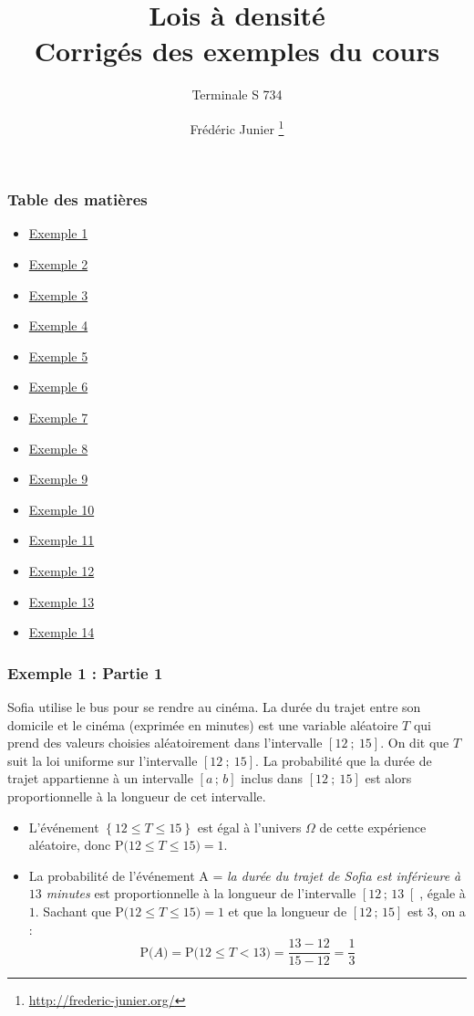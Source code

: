 \documentclass[xcolor=svgnames,t,final]{beamer}
\title{Lois à densité \\ Corrigés des exemples du cours}\subtitle{Terminale S 734}
\author[]{Frédéric Junier \thanks{\url{http://frederic-junier.org/} }}
\institute[Lycée du Parc]{Lycée du Parc, Lyon}
\date[]{}
\newcommand{\Interfo}[2]{\left[#1\, ;\, #2\right[}
\newcommand{\Interff}[2]{\left[#1\, ;\, #2\right]}
\newcommand{\proba}[1]{\text{P}\big(#1\big)}
\begin{document}
\frame{\titlepage}


\begin{frame}
\frametitle{Table des matières}
\begin{itemize}
	\item \hyperlink{exemple1}{Exemple 1}
	\item \hyperlink{exemple2}{Exemple 2}
	\item \hyperlink{exemple3}{Exemple 3}
	\item \hyperlink{exemple4}{Exemple 4}
	\item \hyperlink{exemple5}{Exemple 5}
	\item \hyperlink{exemple6}{Exemple 6}
		\item \hyperlink{exemple7}{Exemple 7}
			\item \hyperlink{exemple8}{Exemple 8}
			\item \hyperlink{exemple9}{Exemple 9}
				\item \hyperlink{exemple10}{Exemple 10}
						\item \hyperlink{exemple11}{Exemple 11}
						\item \hyperlink{exemple12}{Exemple 12}
						\item \hyperlink{exemple13}{Exemple 13}
						\item \hyperlink{exemple14}{Exemple 14}
\end{itemize}

\end{frame}
 


\begin{frame}

\frametitle{Exemple 1 : Partie 1}

\label{exemple1}
Sofia utilise le bus pour se rendre au cinéma.  La durée du trajet entre son domicile et le cinéma (exprimée en minutes) est une variable aléatoire $T$ qui prend des valeurs choisies aléatoirement dans l'intervalle $[12~;~15]$. On dit que $T$ suit la loi uniforme sur l'intervalle $[12~;~15]$. La probabilité que la durée de trajet appartienne à un intervalle $\Interff{a}{b}$ inclus dans $[12~;~15]$ est alors proportionnelle à la longueur de cet intervalle.

\begin{itemize}
\pause \item L'événement $\left\{12 \leqslant  T \leqslant 15\right\}$ est égal à l'univers $\Omega$ de cette expérience aléatoire, donc   $\proba{12 \leqslant T \leqslant 15}=1$.
	\pause \item La probabilité de l'événement A = \og{} \textit{la durée du trajet de Sofia est  inférieure  à $13$ minutes} \fg{} est proportionnelle à la longueur de l'intervalle $\Interfo{12}{13}$, égale à $1$. Sachant que $\proba{12 \leqslant T \leqslant 15}=1$ et que la longueur de $\Interff{12}{15}$ est $3$, on a :	
\begin{equation*}
\proba{A}=\proba{12 \leqslant T < 13}=\frac{13-12}{15-12}=\frac{1}{3}
\end{equation*}


\end{itemize}


\end{frame}
\end{document}
